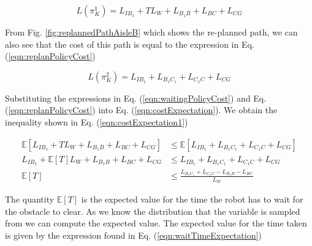 \documentclass[a4paper,12pt]{article}
\begin{document}
			\begin{equation}
			L\left(\pi_{K}^{1}\right) = L_{IB_{1}} + TL_W + L_{B_{1}B} + L_{BC} + L_{CG}
			\label{eqn:waitingPolicyCost}
			\end{equation}
			
			From Fig. \ref{fig:replannedPathAisleB} which shows the re-planned path, we can also see that the cost of this path is equal to the expression in Eq. (\ref{eqn:replanPolicyCost})
			
			\begin{equation}
			L\left(\pi_{K}^{2}\right) = L_{IB_{1}} + L_{B_{1}C_{1}} + L_{C_{1}C} + L_{CG}
			\label{eqn:replanPolicyCost}
			\end{equation}
			
			Substituting the expressions in Eq. (\ref{eqn:waitingPolicyCost}) and Eq. (\ref{eqn:replanPolicyCost}) into Eq. (\ref{eqn:costExpectation}). We obtain the inequality shown in Eq. (\ref{eqn:costExpectation1})
			
			\begin{equation}
			\begin{split}
			\mathbb{E}\left[L_{IB_{1}} + TL_W + L_{B_{1}B} + L_{BC} + L_{CG}\right] & \leq \mathbb{E}\left[L_{IB_{1}} + L_{B_{1}C_{1}} + L_{C_{1}C} + L_{CG}\right] \\
			L_{IB_{1}} + \mathbb{E}\left[T\right] L_W + L_{B_{1}B} + L_{BC} + L_{CG} & \leq L_{IB_{1}} + L_{B_{1}C_{1}} + L_{C_{1}C} + L_{CG} \\
			\mathbb{E}\left[T\right] & \leq \frac{L_{B_{1}C_{1}} + L_{C_{1}C} - L_{B_{1}B} - L_{BC}}{L_W}
			\end{split}
			\label{eqn:costExpectation1}
			\end{equation}
			
			The quantity $\mathbb{E}\left[T\right]$ is the expected value for the time the robot has to wait for the obstacle to clear. As we know the distribution that the variable is sampled from we can compute the expected value. The expected value for the time taken is given by the expression found in Eq. (\ref{eqn:waitTimeExpectation})
			
\end{document}
